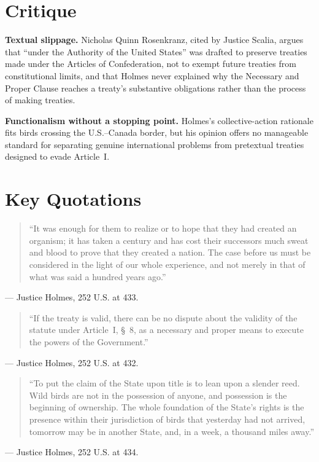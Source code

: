 \documentclass[12pt]{article}
\begin{document}
\section{Critique}

\textbf{Textual slippage.} Nicholas Quinn Rosenkranz, cited by Justice Scalia, argues that ``under the Authority of the United States'' was drafted to preserve treaties made under the Articles of Confederation, not to exempt future treaties from constitutional limits, and that Holmes never explained why the Necessary and Proper Clause reaches a treaty's substantive obligations rather than the process of making treaties.

\textbf{Functionalism without a stopping point.} Holmes's collective-action rationale fits birds crossing the U.S.--Canada border, but his opinion offers no manageable standard for separating genuine international problems from pretextual treaties designed to evade Article~I.

\section{Key Quotations}

\begin{quote}
``It was enough for them to realize or to hope that they had created an organism; it has taken a century and has cost their successors much sweat and blood to prove that they created a nation. The case before us must be considered in the light of our whole experience, and not merely in that of what was said a hundred years ago.''
\end{quote}
\noindent --- Justice Holmes, 252 U.S. at 433.

\begin{quote}
``If the treaty is valid, there can be no dispute about the validity of the statute under Article~I, \S~8, as a necessary and proper means to execute the powers of the Government.''
\end{quote}
\noindent --- Justice Holmes, 252 U.S. at 432.

\begin{quote}
``To put the claim of the State upon title is to lean upon a slender reed. Wild birds are not in the possession of anyone, and possession is the beginning of ownership. The whole foundation of the State's rights is the presence within their jurisdiction of birds that yesterday had not arrived, tomorrow may be in another State, and, in a week, a thousand miles away.''
\end{quote}
\noindent --- Justice Holmes, 252 U.S. at 434.
\end{document}
